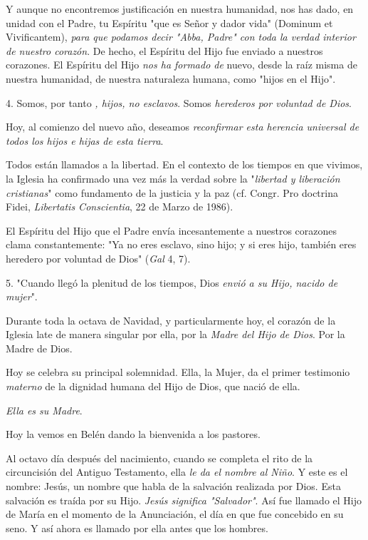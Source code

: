 \begin{body}
Y aunque no encontremos justificación en nuestra humanidad, nos has dado, en unidad con el Padre, tu Espíritu "que es Señor y dador vida" (Dominum et Vivificantem), \emph{para que podamos decir "Abba, Padre" 	con toda la verdad interior de nuestro corazón}. De hecho, el Espíritu del Hijo fue enviado a nuestros corazones. El Espíritu del Hijo \emph{nos ha formado de} nuevo, desde la raíz misma de nuestra humanidad, de nuestra naturaleza humana, como "hijos en el Hijo".

4. Somos, por tanto \emph{, hijos, no esclavos}. Somos \emph{herederos 	por voluntad de Dios}.

Hoy, al comienzo del nuevo año, deseamos \emph{reconfirmar esta herencia 	universal de todos los hijos e hijas de esta tierra}.

Todos están llamados a la libertad. En el contexto de los tiempos en que vivimos, la Iglesia ha confirmado una vez más la verdad sobre la "\emph{libertad y liberación cristianas}" como fundamento de la justicia y la paz (cf. Congr. Pro doctrina Fidei, \emph{Libertatis Conscientia}, 22 de Marzo de 1986).

El Espíritu del Hijo que el Padre envía incesantemente a nuestros corazones clama constantemente: "Ya no eres esclavo, sino hijo; y si eres hijo, también eres heredero por voluntad de Dios" (\emph{Gal} 4, 7).

5. "Cuando llegó la plenitud de los tiempos, Dios \emph{envió a su Hijo, 	nacido de mujer}".

Durante toda la octava de Navidad, y particularmente hoy, el corazón de la Iglesia late de manera singular por ella, por la \emph{Madre del Hijo 	de Dios}. Por la Madre de Dios.

Hoy se celebra su principal solemnidad. Ella, la Mujer, da el primer testimonio \emph{materno} de la dignidad humana del Hijo de Dios, que nació de ella.

\emph{Ella es su Madre}.

Hoy la vemos en Belén dando la bienvenida a los pastores.

Al octavo día después del nacimiento, cuando se completa el rito de la circuncisión del Antiguo Testamento, ella \emph{le da el nombre al 	Niño}. Y este es el nombre: Jesús, un nombre que habla de la salvación realizada por Dios. Esta salvación es traída por su Hijo. \emph{Jesús 	significa "Salvador"}. Así fue llamado el Hijo de María en el momento de la Anunciación, el día en que fue concebido en su seno. Y así ahora es llamado por ella antes que los hombres.


\end{body}
